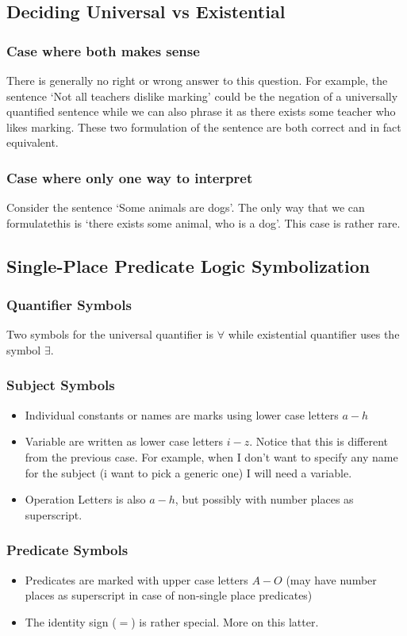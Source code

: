 \documentclass[10pt]{article}
\begin{document}
\subsection{Deciding Universal vs Existential}
\subsubsection{Case where both makes sense}
There is generally no right or wrong answer to this question. For example, the sentence `Not all teachers dislike marking' could be the negation of a universally quantified sentence while we can also phrase it as there exists some teacher who likes marking. These two formulation of the sentence are both correct and in fact equivalent. 
\subsubsection{Case where only one way to interpret} 
Consider the sentence `Some animals are dogs'. The only way that we can formulatethis is `there exists some animal, who is a dog'. This case is rather rare.

\subsection{Single-Place Predicate Logic Symbolization}
\subsubsection{Quantifier Symbols}
Two symbols for the universal quantifier is $\forall$ while existential quantifier uses the symbol $\exists$. 
\subsubsection{Subject Symbols}
\begin{itemize}
    \item Individual constants or names are marks using lower case letters $a-h$
    \item Variable are written as lower case letters $i-z$. Notice that this is different from the previous case. For example, when I don't want to specify any name for the subject (i want to pick a generic one) I will need a variable.
    \item Operation Letters is also $a-h$, but possibly with number places as superscript.
\end{itemize}

\subsubsection{Predicate Symbols}
\begin{itemize}
    \item Predicates are marked with upper case letters $A-O$ (may have number places as superscript in case of non-single place predicates)
    \item The identity sign ($=$) is rather special. More on this latter.
\end{itemize}
\end{document}

